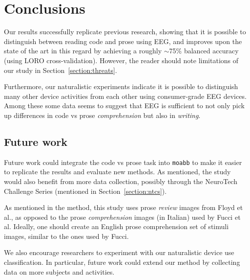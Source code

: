 \chapter{Conclusions}

Our results successfully replicate previous research, showing that it is possible to distinguish between reading code and prose using EEG, and improves upon the state of the art in this regard by achieving a roughly $\sim$75\% balanced accuracy (using LORO cross-validation). However, the reader should note limitations of our study in Section~\ref{section:threats}.

Furthermore, our naturalistic experiments indicate it is possible to distinguish many other device activities from each other using consumer-grade EEG devices. Among these some data seems to suggest that EEG is sufficient to not only pick up differences in code vs prose \emph{comprehension} but also in \emph{writing}.

\section{Future work}

Future work could integrate the code vs prose task into \texttt{moabb} to make it easier to replicate the results and evaluate new methods. As mentioned, the study would also benefit from more data collection, possibly through the NeuroTech Challenge Series (mentioned in Section~\ref{section:ntcs}).

As mentioned in the method, this study uses prose \emph{review} images from Floyd et al., as opposed to the prose \emph{comprehension} images (in Italian) used by Fucci et al. Ideally, one should create an English prose comprehension set of stimuli images, similar to the ones used by Fucci.

We also encourage researchers to experiment with our naturalistic device use classification. In particular, future work could extend our method by collecting data on more subjects and activities.
